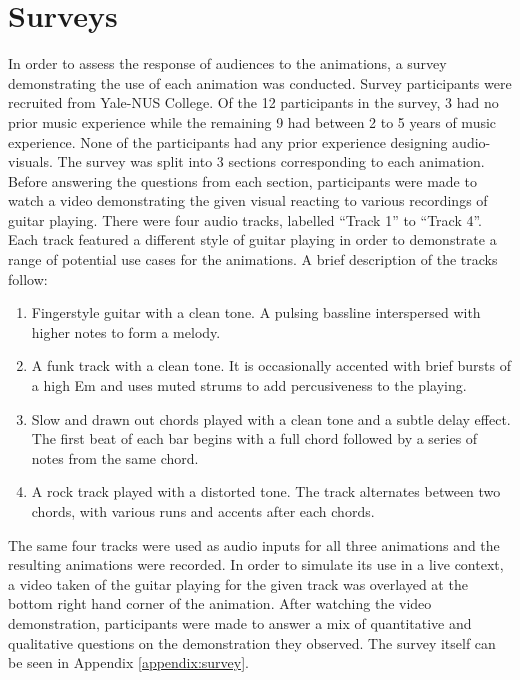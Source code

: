 \documentclass[../initial_thesis.tex]{subfiles}
\begin{document}
\section{Surveys} \label{sec:surveys}

In order to assess the response of audiences to the animations, a survey demonstrating the use of each animation was conducted. Survey participants were recruited from Yale-NUS College. Of the 12 participants in the survey, 3 had no prior music experience while the remaining 9 had between 2 to 5 years of music experience. None of the participants had any prior experience designing audio-visuals. The survey was split into 3 sections corresponding to each animation. Before answering the questions from each section, participants were made to watch a video demonstrating the given visual reacting to various recordings of guitar playing. There were four audio tracks, labelled ``Track 1'' to ``Track 4''. Each track featured a different style of guitar playing in order to demonstrate a range of potential use cases for the animations. A brief description of the tracks follow:

\begin{enumerate}
\item {Fingerstyle guitar with a clean tone. A pulsing bassline interspersed with higher notes to form a melody.} %
\item {A funk track with a clean tone. It is occasionally accented with brief bursts of a high Em and uses muted strums to add percusiveness to the playing.}
\item {Slow and drawn out chords played with a clean tone and a subtle delay effect. The first beat of each bar begins with a full chord followed by a series of notes from the same chord.}
\item {A rock track played with a distorted tone. The track alternates between two chords, with various runs and accents after each chords.}
\end{enumerate}

The same four tracks were used as audio inputs for all three animations and the resulting animations were recorded. In order to simulate its use in a live context, a video taken of the guitar playing for the given track was overlayed at the bottom right hand corner of the animation. After watching the video demonstration, participants were made to answer a mix of quantitative and qualitative questions on the demonstration they observed. The survey itself can be seen in Appendix \ref{appendix:survey}. \par
\end{document}
